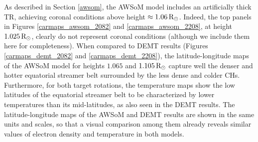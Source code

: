 \documentclass[namedreferences]{solarphysics}
\newcommand{\mrsun}{{\rm R_\odot}}
\begin{document}
\begin{article}
{As described in Section \ref{awsom}, the AWSoM model includes an artificially thick TR, achieving coronal conditions above height $\approx 1.06\,\mrsun$. Indeed, the top panels in Figures \ref{carmaps_awsom_2082} and \ref{carmaps_awsom_2208}, at height $1.025\,\mrsun$, clearly do not represent coronal conditions (although we include them here for completeness). When compared to DEMT results (Figures \ref{carmaps_demt_2082} and \ref{carmaps_demt_2208}), the latitude-longitude maps of the AWSoM model for heights $1.065$ and $1.105\,\mrsun$ capture well the denser and hotter equatorial streamer belt surrounded by the less dense and colder CHs. Furthermore, for both target rotations, the temperature maps show the low latitudes of the equatorial streamer belt to be characterized by lower temperatures than its mid-latitudes, as also seen in the DEMT results. The latitude-longitude maps of the AWSoM and DEMT results are shown in the same units and scales, so that a visual comparison among them already reveals similar values of electron density and temperature in both models.}


\end{article}
\end{document}
